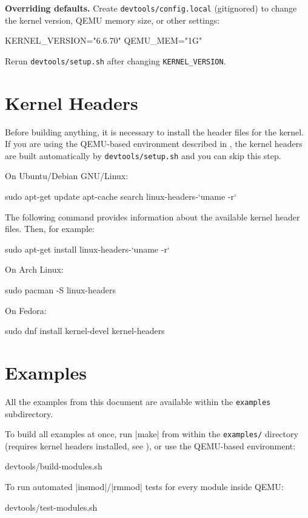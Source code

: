 \documentclass[10pt, oneside]{book}
\begin{document}
\textbf{Overriding defaults.}
Create \verb|devtools/config.local| (gitignored) to change the kernel version,
QEMU memory size, or other settings:
\begin{code}
KERNEL_VERSION="6.6.70"
QEMU_MEM="1G"
\end{code}
Rerun \verb|devtools/setup.sh| after changing \verb|KERNEL_VERSION|.

\section{Kernel Headers}
\label{sec:headers}
Before building anything, it is necessary to install the header files for the kernel.
If you are using the QEMU-based environment described in ,
the kernel headers are built automatically by \verb|devtools/setup.sh| and you can
skip this step.

On Ubuntu/Debian GNU/Linux:
\begin{codebash}
sudo apt-get update
apt-cache search linux-headers-`uname -r`
\end{codebash}

The following command provides information about the available kernel header files.
Then, for example:
\begin{codebash}
sudo apt-get install linux-headers-`uname -r`
\end{codebash}

On Arch Linux:
\begin{codebash}
sudo pacman -S linux-headers
\end{codebash}

On Fedora:
\begin{codebash}
sudo dnf install kernel-devel kernel-headers
\end{codebash}

\section{Examples}
\label{sec:examples}
All the examples from this document are available within the \verb|examples| subdirectory.

To build all examples at once, run \sh|make| from within the \verb|examples/| directory
(requires kernel headers installed, see ), or use the QEMU-based
environment:
\begin{codebash}
devtools/build-modules.sh
\end{codebash}

To run automated \sh|insmod|/\sh|rmmod| tests for every module inside QEMU:
\begin{codebash}
devtools/test-modules.sh
\end{codebash}
\end{document}
